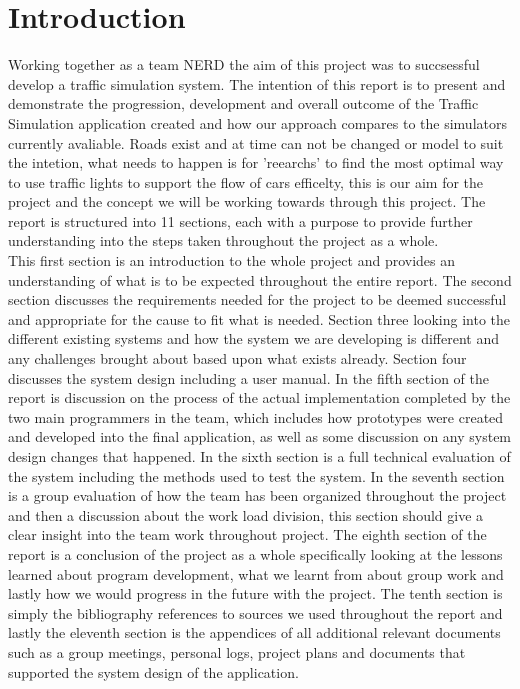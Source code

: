 \documentclass[11pt]{article}
\begin{document}
	\section{Introduction} %
Working together as a team NERD the aim of this project was to succsessful develop a traffic simulation system. The intention of this report is to present and demonstrate the progression, development and overall outcome of the Traffic Simulation application created and how our approach compares to the simulators currently avaliable. 
Roads exist and at time can not be changed or model to suit the intetion, what needs to happen is for 'reearchs' to find the most optimal way to use traffic lights to support the flow of cars efficelty, this is our aim for the project and the concept we will be working towards through this project. 
The report is structured into 11 sections, each with a purpose to provide further understanding into the steps taken throughout the project as a whole. 
	\\ This first section is an introduction to the whole project and provides an understanding of what is to be expected throughout the entire report. The second section discusses the requirements needed for the project to be deemed successful and appropriate for the cause to fit what is needed. Section three looking into the different existing systems and how the system we are developing is different and any challenges brought about based upon what exists already. Section four discusses the system design including a user manual. In the fifth section of the report is discussion on the process of the actual implementation completed by the two main programmers in the team, which includes how prototypes were created and developed into the final application, as well as some discussion on any system design changes that happened. In the sixth section is a full technical evaluation of the system including the methods used to test the system. In the seventh section is a group evaluation of how the team has been organized throughout the project and then a discussion about the work load division, this section should give a clear insight into the team work throughout project. The eighth section of the report is a conclusion of the project as a whole specifically looking at the lessons learned about program development, what we learnt from about group work and lastly how we would progress in the future with the project. The tenth section is simply the bibliography references to sources we used throughout the report and lastly the eleventh section is the appendices of all additional relevant documents such as a group meetings, personal logs, project plans and documents that supported the system design of the application.\\
	
\end{document}

